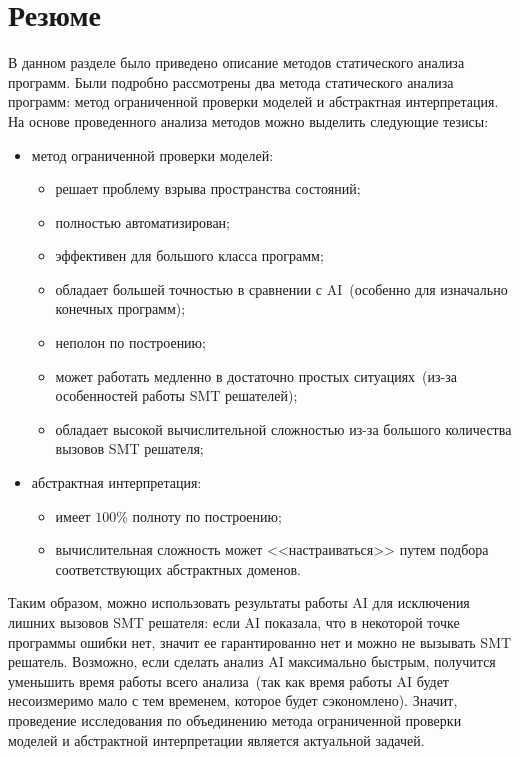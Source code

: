 \section{Резюме}
В данном разделе было приведено описание методов статического анализа 
программ. Были подробно рассмотрены два метода статического анализа программ: 
метод ограниченной проверки моделей и
абстрактная интерпретация. На основе проведенного анализа методов можно 
выделить следующие тезисы:
\begin{itemize}
\item метод ограниченной проверки моделей:
	\begin{itemize}
	\item решает проблему взрыва пространства состояний;
	\item полностью автоматизирован;
	\item эффективен для большого класса программ;
	\item обладает большей точностью в сравнении с AI~(особенно для изначально 
	конечных программ);
	\item неполон по построению;
	\item может работать медленно в достаточно простых ситуациях~(из-за 
	особенностей работы SMT решателей);
	\item обладает высокой вычислительной сложностью из-за большого количества
	вызовов SMT решателя;
	\end{itemize}
\item абстрактная интерпретация:
	\begin{itemize}
	\item имеет $100\%$ полноту по построению;
	\item вычислительная сложность может <<настраиваться>> путем подбора
	соответствующих абстрактных доменов.
	\end{itemize}
\end{itemize}

Таким образом, можно использовать результаты работы AI для исключения 
лишних вызовов SMT решателя: если AI показала, что в некоторой точке программы 
ошибки нет, значит ее гарантированно нет и можно не вызывать SMT решатель. 
Возможно, если сделать анализ AI максимально быстрым, получится уменьшить время работы 
всего анализа~(так как время работы AI будет несоизмеримо мало с тем временем, 
которое будет сэкономлено). Значит, проведение исследования по объединению 
метода ограниченной проверки моделей и абстрактной интерпретации является 
актуальной задачей.